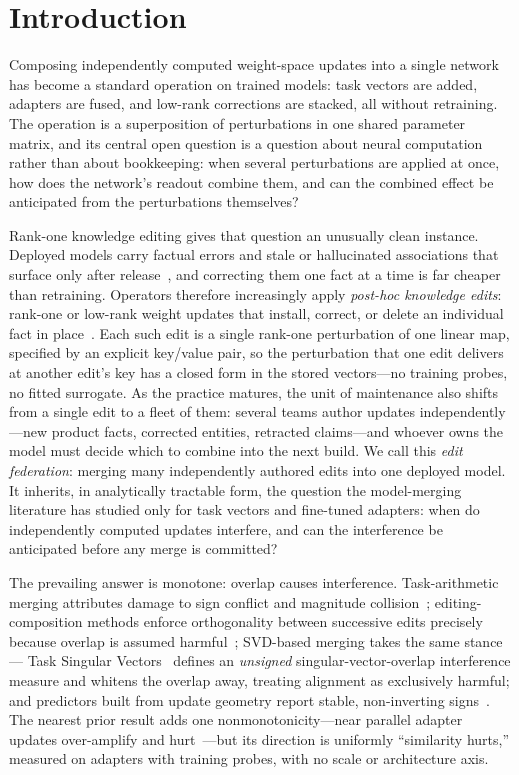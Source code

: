 \documentclass[preprint,12pt]{elsarticle}
\theoremstyle{definition}
\begin{document}
\section{Introduction}\label{sec:intro}
Composing independently computed weight-space updates into a single network has become a
standard operation on trained models: task vectors are added, adapters are fused, and
low-rank corrections are stacked, all without retraining. The operation is a
superposition of perturbations in one shared parameter matrix, and its central open
question is a question about neural computation rather than about bookkeeping: when
several perturbations are applied at once, how does the network's readout combine them,
and can the combined effect be anticipated from the perturbations themselves?

Rank-one knowledge editing gives that question an unusually clean instance. Deployed
models carry factual errors and stale or hallucinated associations that surface only
after release~\cite{hallucinationsurvey2023}, and correcting them one fact at a time is
far cheaper than retraining. Operators therefore increasingly apply \emph{post-hoc
knowledge edits}: rank-one or low-rank weight updates that install, correct, or delete an
individual fact in place~\cite{rome2022,memit2023,alphaedit2024}. Each such edit is a
single rank-one perturbation of one linear map, specified by an explicit key/value pair,
so the perturbation that one edit delivers at another edit's key has a closed form in the
stored vectors---no training probes, no fitted surrogate. As the practice matures, the
unit of maintenance also shifts from a single edit to a fleet of them: several teams
author updates independently---new product facts, corrected entities, retracted
claims---and whoever owns the model must decide which to combine into the next build. We
call this \emph{edit federation}: merging many independently authored edits into one
deployed model. It inherits, in analytically tractable form, the question the
model-merging literature has studied only for task vectors and fine-tuned adapters: when
do independently computed updates interfere, and can the interference be anticipated
before any merge is committed?

The prevailing answer is monotone: overlap causes interference. Task-arithmetic merging
attributes damage to sign conflict and magnitude collision~\cite{ties2023,dare2023};
editing-composition methods enforce orthogonality between successive edits precisely
because overlap is assumed harmful~\cite{memitmerge2025,oedit2024,orthoedit2026a,orthoedit2026b};
SVD-based merging takes the same stance --- Task Singular Vectors~\cite{tsv2024}
defines an \emph{unsigned} singular-vector-overlap interference measure and whitens
the overlap away, treating alignment as exclusively harmful; and
predictors built from update geometry report stable, non-inverting
signs~\cite{demystify2026}. The nearest prior result adds one nonmonotonicity---near
parallel adapter updates over-amplify and hurt~\cite{mergeprobe2026}---but its direction is
uniformly ``similarity hurts,'' measured on adapters with training probes, with no scale or
architecture axis.
\end{document}
